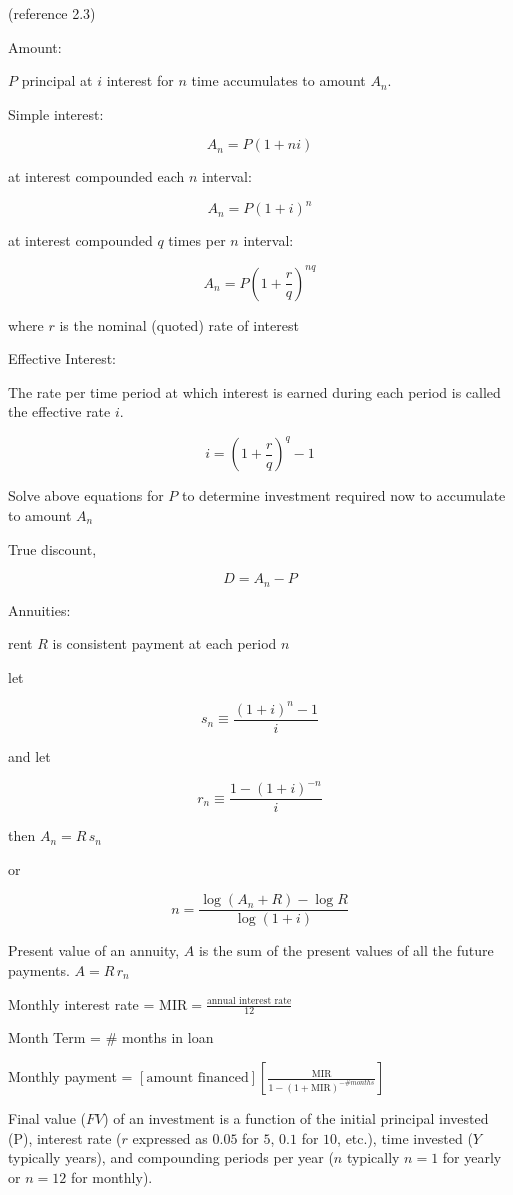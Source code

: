 \documentclass[
]{book}
\begin{document}
(reference 2.3)

Amount:

\(P\) principal at \(i\) interest for \(n\) time accumulates to amount \(A_{n}\).

Simple interest:

\[A_{n} = P(1 + ni)\]

at interest compounded each \(n\) interval:

\[A_{n} = P(1 + i)^n \]

at interest compounded \(q\) times per \(n\) interval:

\[A_{n} = P(1 + \frac{r}{q})^{nq} \]

where \(r\) is the nominal (quoted) rate of interest

Effective Interest:

The rate per time period at which interest is earned during each period is called the effective rate \(i\).

\[i = \left( 1 + \frac{r}{q} \right)^q -1\]

Solve above equations for \(P\) to determine investment required now to accumulate to amount \(A_{n}\)

True discount,

\[D = A_{n} - P\]

Annuities:

rent \(R\) is consistent payment at each period \(n\)

let

\[s_n \equiv \frac{\left( 1 + i \right)^n - 1}{i}\]

and let

\[r_n \equiv \frac{1 - \left( 1 + i \right)^{-n}}{i} \]

then \(A_n = R\,s_{n}\)

or

\[n = \frac{\log \left( A_n + R \right) - \log R }{\log \left(1 + i \right)} \]

Present value of an annuity, \(A\) is the sum of the present values of all the future payments. \(A = R\,r_{n}\)

Monthly interest rate = \(\mathrm{MIR} = \frac{ \text{annual interest rate} }{12}\)

Month Term = \# months in loan

Monthly payment = \(\left[ \text{amount financed} \right] \left[ \frac{\mathrm{MIR}}{1 - \left( 1 + \mathrm{MIR} \right)^{-\#months}} \right]\)

Final value (\(FV\)) of an investment is a function of the initial principal invested (P), interest rate (\(r\) expressed as \(0.05\) for \(5%
\), \(0.1\) for \(10%
\), etc.), time invested (\(Y\) typically years), and compounding periods per year (\(n\) typically \(n = 1\) for yearly or \(n = 12\) for monthly).
\end{document}
